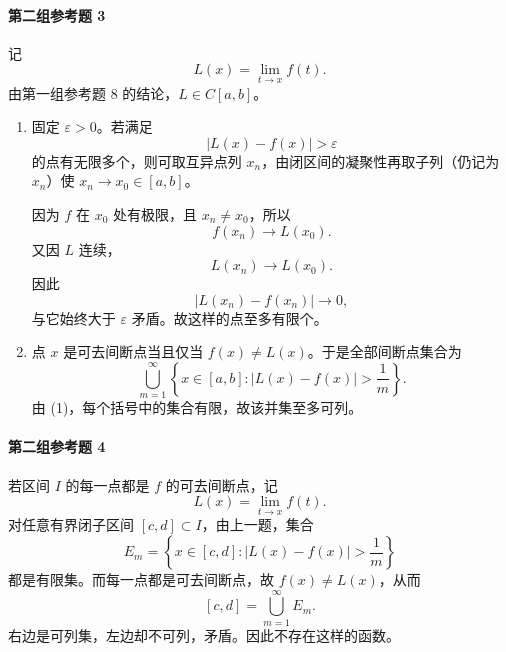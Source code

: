 \paragraph{第二组参考题 3}
\begin{xsolution}
记
\[
 L(x)=\lim_{t\to x}f(t).
\]
由第一组参考题 8 的结论，$L\in C[a,b]$。

\begin{enumerate}[label=(\arabic*)]
 \item 固定 $\varepsilon>0$。若满足
 \[
  |L(x)-f(x)|>\varepsilon
 \]
 的点有无限多个，则可取互异点列 $x_n$，由闭区间的凝聚性再取子列（仍记为 $x_n$）使 $x_n\to x_0\in[a,b]$。

 因为 $f$ 在 $x_0$ 处有极限，且 $x_n\ne x_0$，所以
 \[
  f(x_n)\to L(x_0).
 \]
 又因 $L$ 连续，
 \[
  L(x_n)\to L(x_0).
 \]
 因此
 \[
  |L(x_n)-f(x_n)|\to0,
 \]
 与它始终大于 $\varepsilon$ 矛盾。故这样的点至多有限个。

 \item 点 $x$ 是可去间断点当且仅当 $f(x)\ne L(x)$。于是全部间断点集合为
 \[
  \bigcup_{m=1}^\infty
  \left\{x\in[a,b]:|L(x)-f(x)|>\frac1m\right\}.
 \]
 由 (1)，每个括号中的集合有限，故该并集至多可列。
\end{enumerate}
\end{xsolution}

\paragraph{第二组参考题 4}
\begin{xsolution}
若区间 $I$ 的每一点都是 $f$ 的可去间断点，记
\[
 L(x)=\lim_{t\to x}f(t).
\]
对任意有界闭子区间 $[c,d]\subset I$，由上一题，集合
\[
 E_m=\left\{x\in[c,d]:|L(x)-f(x)|>\frac1m\right\}
\]
都是有限集。而每一点都是可去间断点，故 $f(x)\ne L(x)$，从而
\[
 [c,d]=\bigcup_{m=1}^\infty E_m.
\]
右边是可列集，左边却不可列，矛盾。因此不存在这样的函数。
\end{xsolution}


